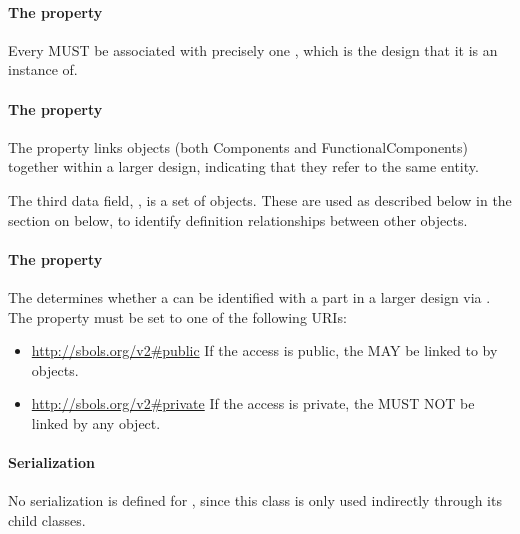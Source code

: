 \paragraph{The  property}
\label{sec:componentDefinition}

Every  MUST be associated with precisely one
, which is the design that it is an instance of.

\paragraph{The  property}
\label{sec:mapsTo}

The  property links  objects (both Components and FunctionalComponents) together within a larger design, indicating that they refer to the same entity.

The third data field, , is a set of  objects.  These are used as described below in the section on  below, to identify definition relationships between other  objects.

\paragraph{The  property}
\label{sec:access}

The  determines whether a  
can be identified with a part in a larger design via .
The  property must be set to one of the following URIs:

\begin{itemize}
\item \url{http://sbols.org/v2#public}
  If the access is public, the  MAY be linked to by  objects.

\item \url{http://sbols.org/v2#private}
  If the access is private, the  MUST NOT be linked by any  object.
\end{itemize}

\paragraph{Serialization}

No serialization is defined for , since this class is 
only used indirectly through its child classes.


